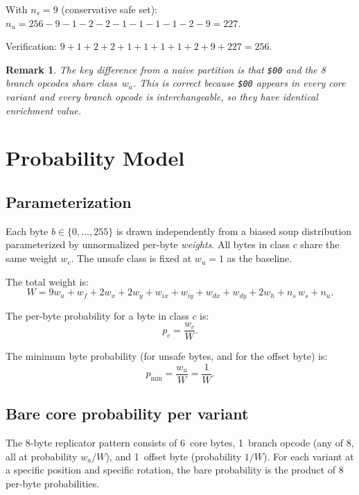 \documentclass{article}
\newcommand{\hex}[1]{\texttt{\$#1}}
\newcommand{\wa}{w_a}
\newcommand{\wf}{w_f}
\newcommand{\wx}{w_x}
\newcommand{\wy}{w_y}
\newcommand{\wix}{w_{ix}}
\newcommand{\wiy}{w_{iy}}
\newcommand{\wdx}{w_{dx}}
\newcommand{\wdy}{w_{dy}}
\newcommand{\wh}{w_h}
\newcommand{\ws}{w_s}
\newcommand{\wu}{w_u}
\newcommand{\pmin}{p_{\min}}
\newtheorem{remark}{Remark}
\begin{document}
With $n_s = 9$ (conservative safe set):
$n_u = 256 - 9 - 1 - 2 - 2 - 1 - 1 - 1 - 1 - 2 - 9 = 227$.

Verification: $9 + 1 + 2 + 2 + 1 + 1 + 1 + 1 + 2 + 9 + 227 = 256$.\ \checkmark

\begin{remark}
The key difference from a naive partition is that \hex{00} and the
8 branch opcodes share class~$\wa$.  This is correct because \hex{00}
appears in every core variant and every branch opcode is interchangeable,
so they have identical enrichment value.
\end{remark}

\section{Probability Model}
\label{sec:model}

\subsection{Parameterization}

Each byte $b \in \{0,\ldots,255\}$ is drawn independently from a
biased soup distribution parameterized by unnormalized per-byte
\emph{weights}.  All bytes in class $c$ share the same weight $w_c$.
The unsafe class is fixed at $\wu = 1$ as the baseline.

The total weight is:
\begin{equation}
\boxed{
W = 9\wa + \wf + 2\wx + 2\wy + \wix + \wiy + \wdx + \wdy
    + 2\wh + n_s\,\ws + n_u.
}
\label{eq:W}
\end{equation}

The per-byte probability for a byte in class $c$ is:
\begin{equation}
p_c = \frac{w_c}{W}.
\label{eq:pc}
\end{equation}

The minimum byte probability (for unsafe bytes, and for the offset byte) is:
\begin{equation}
\pmin = \frac{\wu}{W} = \frac{1}{W}.
\label{eq:pmin}
\end{equation}

\subsection{Bare core probability per variant}

The 8-byte replicator pattern consists of 6~core bytes, 1~branch
opcode (any of 8, all at probability $\wa/W$), and 1~offset byte
(probability $1/W$).  For each variant at a specific position and
specific rotation, the bare probability is the product of 8 per-byte
probabilities.
\end{document}
